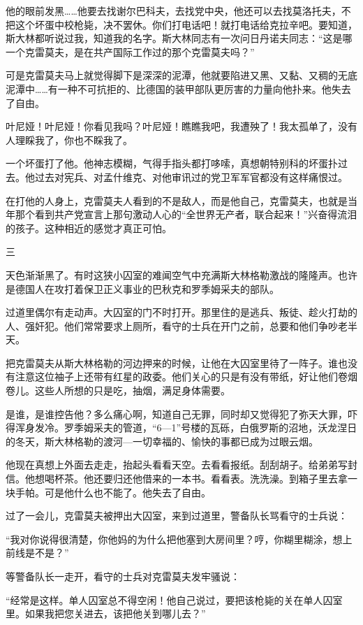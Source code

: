 他的眼前发黑……他要去找谢尔巴科夫，去找党中央，他还可以去找莫洛托夫，不把这个坏蛋中校枪毙，决不罢休。你们打电话吧！就打电话给克拉辛吧。要知道，斯大林都听说过我，知道我的名字。斯大林同志有一次问日丹诺夫同志：“这是哪一个克雷莫夫，是在共产国际工作过的那个克雷莫夫吗？”

可是克雷莫夫马上就觉得脚下是深深的泥潭，他就要陷进又黑、又黏、又稠的无底泥潭中……有一种不可抗拒的、比德国的装甲部队更厉害的力量向他扑来。他失去了自由。

叶尼娅！叶尼娅！你看见我吗？叶尼娅！瞧瞧我吧，我遭殃了！我太孤单了，没有人理睬我了，你也不睬我了。

一个坏蛋打了他。他神志模糊，气得手指头都打哆嗦，真想朝特别科的坏蛋扑过去。他过去对宪兵、对孟什维克、对他审讯过的党卫军军官都没有这样痛恨过。

在打他的人身上，克雷莫夫人看到的不是敌人，而是他自己，克雷莫夫，也就是当年那个看到共产党宣言上那句激动人心的“全世界无产者，联合起来！”兴奋得流泪的孩子。这种相近的感觉才真正可怕。

三

天色渐渐黑了。有时这狭小囚室的难闻空气中充满斯大林格勒激战的隆隆声。也许是德国人在攻打着保卫正义事业的巴秋克和罗季姆采夫的部队。

过道里偶尔有走动声。大囚室的门不时打开。那里住的是逃兵、叛徒、趁火打劫的人、强奸犯。他们常常要求上厕所，看守的士兵在开门之前，总要和他们争吵老半天。

把克雷莫夫从斯大林格勒的河边押来的时候，让他在大囚室里待了一阵子。谁也没有注意这位袖子上还带有红星的政委。他们关心的只是有没有带纸，好让他们卷烟卷儿。这些人所想的只是吃，抽烟，满足身体需要。

是谁，是谁控告他？多么痛心啊，知道自己无罪，同时却又觉得犯了弥天大罪，吓得浑身发冷。罗季姆采夫的管道，“6—1”号楼的瓦砾，白俄罗斯的沼地，沃龙涅日的冬天，斯大林格勒的渡河—一切幸福的、愉快的事都已成为过眼云烟。

他现在真想上外面去走走，抬起头看看天空。去看看报纸。刮刮胡子。给弟弟写封信。他想喝杯茶。他还要归还他借来的一本书。看看表。洗洗澡。到箱子里去拿一块手帕。可是他什么也不能了。他失去了自由。

过了一会儿，克雷莫夫被押出大囚室，来到过道里，警备队长骂看守的士兵说：

“我对你说得很清楚，你他妈的为什么把他塞到大房间里？哼，你糊里糊涂，想上前线是不是？”

等警备队长一走开，看守的士兵对克雷莫夫发牢骚说：

“经常是这样。单人囚室总不得空闲！他自己说过，要把该枪毙的关在单人囚室里。如果我把您关进去，该把他关到哪儿去？”

